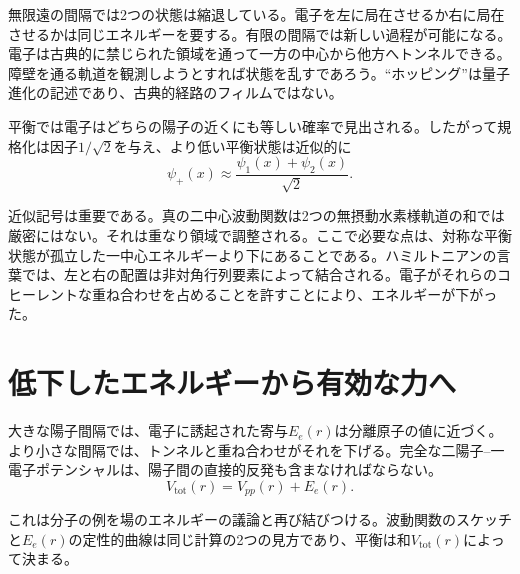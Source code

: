 無限遠の間隔では2つの状態は縮退している。電子を左に局在させるか右に局在させるかは同じエネルギーを要する。有限の間隔では新しい過程が可能になる。電子は古典的に禁じられた領域を通って一方の中心から他方へトンネルできる。障壁を通る軌道を観測しようとすれば状態を乱すであろう。``ホッピング''は量子進化の記述であり、古典的経路のフィルムではない。

平衡では電子はどちらの陽子の近くにも等しい確率で見出される。したがって規格化は因子\(1/\sqrt2\)を与え、より低い平衡状態は近似的に
\begin{equation}
\psi_+(x)\approx \frac{\psi_1(x)+\psi_2(x)}{\sqrt2}.
\end{equation}

近似記号は重要である。真の二中心波動関数は2つの無摂動水素様軌道の和では厳密にはない。それは重なり領域で調整される。ここで必要な点は、対称な平衡状態が孤立した一中心エネルギーより下にあることである。ハミルトニアンの言葉では、左と右の配置は非対角行列要素によって結合される。電子がそれらのコヒーレントな重ね合わせを占めることを許すことにより、エネルギーが下がった。

\section{低下したエネルギーから有効な力へ}

大きな陽子間隔では、電子に誘起された寄与\(E_e(r)\)は分離原子の値に近づく。より小さな間隔では、トンネルと重ね合わせがそれを下げる。完全な二陽子--一電子ポテンシャルは、陽子間の直接的反発も含まなければならない。
\begin{equation}
V_{\mathrm{tot}}(r)=V_{pp}(r)+E_e(r).
\end{equation}

これは分子の例を場のエネルギーの議論と再び結びつける。波動関数のスケッチと\(E_e(r)\)の定性的曲線は同じ計算の2つの見方であり、平衡は和\(V_{\mathrm{tot}}(r)\)によって決まる。

